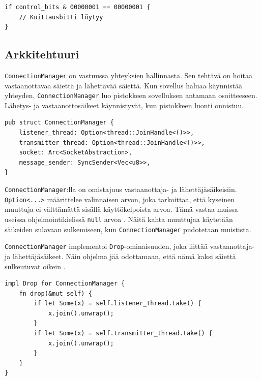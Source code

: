 \documentclass[a4paper,12pt]{article}
\begin{document}
    \begin{lstlisting}[caption={Kuittasbitin tarkistus ohjausbiteistä}, label={lst:ack_check}]
if control_bits & 00000001 == 00000001 {
    // Kuittausbitti löytyy
}\end{lstlisting}

    \subsection{Arkkitehtuuri}\label{sec:arkkitehtuuri}
    \architecture

    \lstinline{ConnectionManager} on vastuussa yhteyksien hallinnasta. Sen tehtävä on
    hoitaa vastaanottavaa säiettä ja lähettävää säiettä. Kun sovellus haluaa käynnistää yhteyden,
    \lstinline{ConnectionManager} luo pistokkeen sovelluksen antamaan osoitteeseen.
    Lähetys- ja vastaanottosäikeet käynnistyvät, kun pistokkeen luonti onnistuu.
    
    \newpage
    
    \begin{lstlisting}[caption={ConnectionManager:n rakenne}, label={lst:connectionmanager}]
pub struct ConnectionManager {
    listener_thread: Option<thread::JoinHandle<()>>,
    transmitter_thread: Option<thread::JoinHandle<()>>,
    socket: Arc<SocketAbstraction>,
    message_sender: SyncSender<Vec<u8>>,
}\end{lstlisting}

    \lstinline{ConnectionManager}:lla on omistajuus vastaanottaja- ja lähettäjäsäikeisiin.
    \lstinline{Option<...>} määrittelee valinnaisen arvon, joka tarkoittaa, että kyseinen muuttuja ei
    välttämättä sisällä käyttökelpoista arvoa. Tämä vastaa muissa useissa ohjelmointikielissä \lstinline{null} arvoa \cite[luku 6.1]{rust-book}. Näitä kahta muuttujaa käytetään säikeiden sulavaan sulkemiseen, kun \lstinline{ConnectionManager} pudotetaan muistista.

    \lstinline{ConnectionManager} implementoi \lstinline{Drop}-ominaisuuden, joka liittää vastaanottaja-
    ja lähettäjäsäikeet. Näin ohjelma jää odottamaan, että nämä kaksi säiettä sulkeutuvat oikein \cite{rust_doc_joinhandle}.

    \begin{lstlisting}[caption={Drop-ominaisuuden toteutus ConnectionManager:ille}, label={lst:connectionmanager_drop}]
impl Drop for ConnectionManager {
    fn drop(&mut self) {
        if let Some(x) = self.listener_thread.take() {
            x.join().unwrap();
        }
        if let Some(x) = self.transmitter_thread.take() {
            x.join().unwrap();
        }
    }
}\end{lstlisting}
\end{document}
